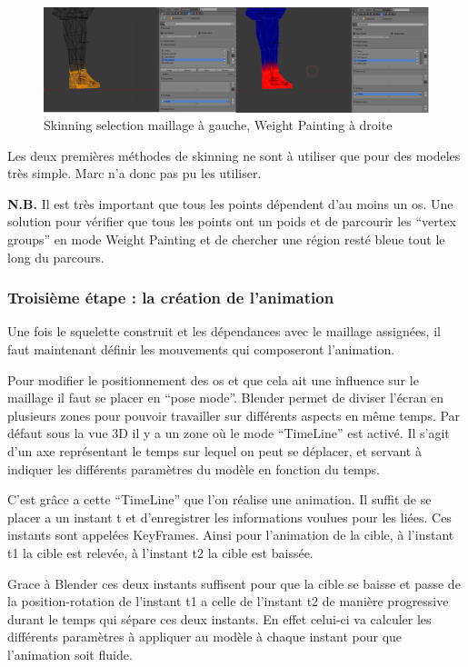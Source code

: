 \documentclass[11pt]{report}
\begin{document}
\begin{figure}[htbp]
\centering
\includegraphics[scale=0.8]{skinning.png}
\caption{Skinning selection maillage à gauche, Weight Painting à droite}
\end{figure}

Les deux premières méthodes de skinning ne sont à utiliser que pour des modeles très simple. Marc n’a donc pas pu les utiliser.

\noindent\textbf{N.B.} Il est très important que tous les points dépendent d’au moins un os. Une solution pour vérifier que tous les points ont un poids et de parcourir les ``vertex groups'' en mode Weight Painting et de chercher une région resté bleue tout le long du parcours.

\subsubsection{Troisième étape : la création de l’animation}

Une fois le squelette construit et les dépendances avec le maillage assignées, il faut maintenant définir les mouvements qui composeront l’animation.

Pour modifier le positionnement des os et que cela ait une influence sur le maillage il faut se placer en ``pose mode''.  Blender permet de diviser l’écran en plusieurs zones pour pouvoir travailler sur différents aspects en même temps. Par défaut sous la vue 3D il y a un zone où le mode ``TimeLine'' est activé. Il s’agit d’un axe représentant le temps sur lequel on peut se déplacer, et servant à indiquer les différents paramètres du modèle en fonction du temps.

C’est grâce a cette ``TimeLine'' que l’on réalise une animation. Il suffit de se placer a un instant t et d’enregistrer les informations voulues pour les liées. Ces instants sont appelées KeyFrames. Ainsi pour l’animation de la cible, à l’instant t1 la cible est relevée, à l’instant t2 la cible est baissée.

Grace à Blender ces deux instants suffisent pour que la cible se baisse et passe de la position-rotation de l’instant t1 a celle de l’instant t2 de manière progressive durant le temps qui sépare ces deux instants. En effet celui-ci va calculer les différents paramètres  à appliquer au modèle à chaque instant pour que l’animation soit fluide.
\end{document}
